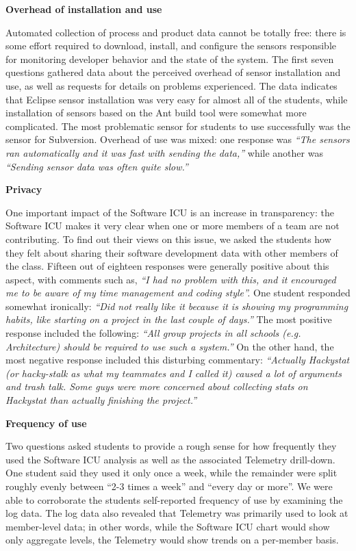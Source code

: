 \documentclass{acm_proc_article-sp}
\begin{document}
{\bf Overhead of installation and use}

Automated collection of process and product data cannot be totally free:
there is some effort required to download, install, and configure the
sensors responsible for monitoring developer behavior and the state of the
system.  The first seven questions gathered data about the perceived
overhead of sensor installation and use, as well as requests for details on
problems experienced. The data indicates that Eclipse sensor installation
was very easy for almost all of the students, while installation of sensors
based on the Ant build tool were somewhat more complicated. The most
problematic sensor for students to use successfully was the sensor for
Subversion.  Overhead of use was mixed: one response was {\em ``The sensors ran
automatically and it was fast with sending the data,''} while another was
{\em ``Sending sensor data was often quite slow.''}  

{\bf Privacy}

One important impact of the Software ICU is an increase in transparency:
the Software ICU makes it very clear when one or more members of a team are
not contributing.  To find out their views on this issue, we asked the
students how they felt about sharing their software development data with
other members of the class.  Fifteen out of eighteen responses were
generally positive about this aspect, with comments such as, {\em ``I had
no problem with this, and it encouraged me to be aware of my time
management and coding style''.}  One student responded somewhat ironically:
{\em ``Did not really like it because it is showing my programming habits,
like starting on a project in the last couple of days.''}  The most
positive response included the following: {\em ``All group projects in all
schools (e.g. Architecture) should be required to use such a system.''}  On
the other hand, the most negative response included this disturbing
commentary: {\em ``Actually Hackystat (or hacky-stalk as what my teammates
and I called it) caused a lot of arguments and trash talk.  Some guys were
more concerned about collecting stats on Hackystat than actually finishing
the project.''}

{\bf Frequency of use}

Two questions asked students to provide a rough sense for how frequently
they used the Software ICU analysis as well as the associated Telemetry
drill-down.  One student said they used it only once a week, while the
remainder were split roughly evenly between ``2-3 times a week'' and
``every day or more''.  We were able to corroborate the students
self-reported frequency of use by examining the log data.  The log data
also revealed that Telemetry was primarily used to look at member-level
data; in other words, while the Software ICU chart would show only
aggregate levels, the Telemetry would show trends on a per-member basis.
\end{document}
